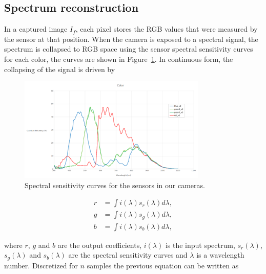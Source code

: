 \subsection{Spectrum reconstruction}
\label{sec:spectrum_reconstruction}

In a captured image $I_f$, each pixel stores the RGB values that were measured by the sensor at that position.
When the camera is exposed to a spectral signal, the spectrum is collapsed to RGB space using the sensor spectral sensitivity curves for each color, the curves are shown in Figure~\ref{fig:camera_sensitivity}.
In continuous form, the collapsing of the signal is driven by

\begin{figure}[htbp!]
\centering
\includegraphics[width=0.8\textwidth]{img/camera_sensitivity}
	\caption{Spectral sensitivity curves for the sensors in our cameras.}
	\label{fig:camera_sensitivity}
\end{figure}

\begin{equation}
\begin{split}
r &= \int i(\lambda) s_r(\lambda) d \lambda, \\
g &= \int i(\lambda) s_g(\lambda) d \lambda, \\
b &= \int i(\lambda) s_b(\lambda) d \lambda,
\end{split}
\label{eq:spectrum_collapse_cont}
\end{equation}

where $r$, $g$ and $b$ are the output coefficients, $i(\lambda)$ is the input spectrum, $s_r(\lambda)$, $s_g(\lambda)$ and $s_b(\lambda)$ are the spectral sensitivity curves and $\lambda$ is a wavelength number.
Discretized for $n$ samples the previous equation can be written as  

